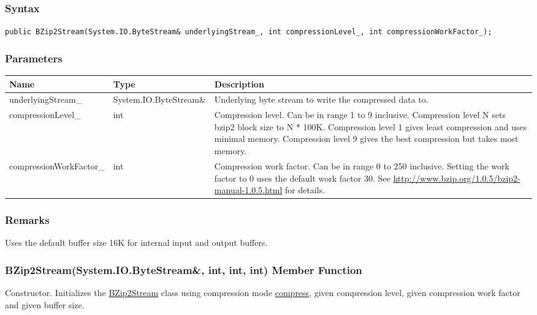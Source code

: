 \documentclass[a4paper,oneside,11.000000pt]{book}
\begin{document}
\subsubsection*{Syntax}
\texttt{public BZip2Stream(System.IO.ByteStream\& underlyingStream\_, int compressionLevel\_, int compressionWorkFactor\_);}
\subsubsection*{Parameters}
\begin{flushleft}
\begin{supertabular}[l]{!{\raggedright}p{4.93333cm}!{\raggedright}p{4.93333cm}!{\raggedright}p{4.93333cm}}
\textbf{Name}
& \textbf{Type}
& \textbf{Description}
\\
\hline
underlyingStream\_
& System.\-IO.\-ByteStream\&\-
& Underlying byte stream to write the compressed data to.

\\
compressionLevel\_
& int
& Compression level. Can be in range 1 to 9 inclusive. Compression level N sets bzip2 block size to N * 100K. 
Compression level 1 gives least compression and uses minimal memory.
Compression level 9 gives the best compression but takes most memory.

\\
compressionWorkFactor\_
& int
& Compression work factor. Can be in range 0 to 250 inclusive. Setting the work factor to 0 uses the default work factor 30.
See \url{http://www.bzip.org/1.0.5/bzip2-manual-1.0.5.html} for details.

\\
\end{supertabular}

\end{flushleft}
\subsubsection*{Remarks}
\begin{flushleft}
Uses the default buffer size 16K for internal input and output buffers.

\end{flushleft}
\clearpage

\hypertarget{System.IO.Compression.BZip2Stream.constructor.P.System.IO.Compression.BZip2Stream.R.System.IO.ByteStream.int.int.int}{\subsubsection*{BZip2Stream(System.IO.ByteStream\&, int, int, int) Member Function}}
\begin{flushleft}
Constructor. Initializes the \hyperlink{System.IO.Compression.BZip2Stream}{BZip2Stream} class using compression mode \hyperlink{System.IO.Compression.CompressionMode.compress}{compress}, 
given compression level, given compression work factor and given buffer size.

\end{flushleft}
\end{document}
